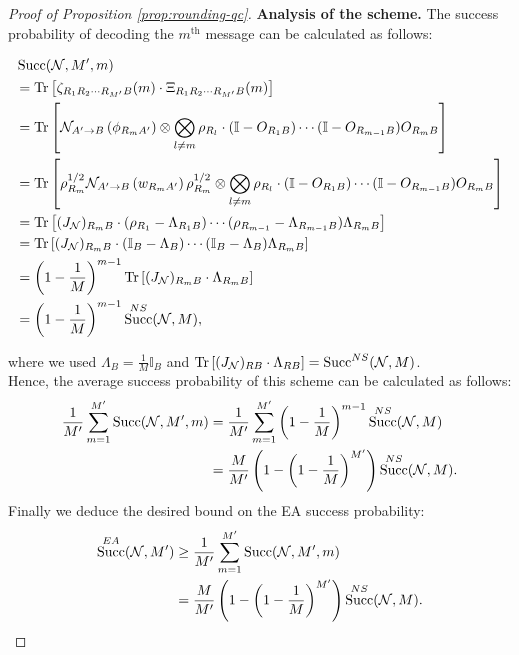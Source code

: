 \documentclass[a4paper,onecolumn,11pt,accepted=2025-10-01]{quantumarticle}
\DeclareMathOperator{\suc}{Succ}
\newcommand*{\dI}{\mathbb{I}}
\newcommand*{\cN}{\mathcal{N}}
\newcommand*{\tr}[1]{\mathrm{Tr}\left[#1\right]}
\begin{document}
\begin{proof}[Proof of Proposition \ref{prop:rounding-qc}]
   
\textbf{Analysis of the scheme.} 
The success probability of decoding the $m^{\text{th}}$ message can be calculated as follows:  
\begin{widetext}
    \begin{align}
        &\suc(\cN, M',m) \\&= \tr{\zeta_{R_1R_2\cdots R_{M'} B}(m) \cdot \Xi _{R_1R_2\cdots R_{M'} B}(m)  }
        \\&= \tr{\cN_{A'\rightarrow B}\left(\phi_{R_m A'}\right)\otimes \bigotimes_{l\neq m} \rho_{R_l}\cdot (\dI-O_{R_{1}B})\cdots(\dI-O_{R_{m-1}B})O_{R_mB}}
        \\&= \tr{ \rho_{R_m}^{1/2}\cN_{A'\rightarrow B}\left(w_{R_m A'}\right)\rho_{R_m}^{1/2}\otimes \bigotimes_{l\neq m} \rho_{R_l}\cdot (\dI-O_{R_{1}B})\cdots(\dI-O_{R_{m-1}B})O_{R_mB}}
           \\&= \tr{ (J_{\cN})_{R_m B}\cdot (\rho_{R_1}-\Lambda_{R_{1}B})\cdots(\rho_{R_{m-1}}-\Lambda_{R_{m-1}B})\Lambda_{R_mB}}
        \\&= \tr{ (J_{\cN})_{R_m B}\cdot (\dI_B-\Lambda_{B})\cdots(\dI_B-\Lambda_{B})\Lambda_{R_mB}}
        \\&= \left(1-\frac{1}{M}\right)^{m-1}\tr{ (J_{\cN})_{R_m B}\cdot \Lambda_{R_mB}}
        \\&= \left(1-\frac{1}{M}\right)^{m-1}\suc^{\rm{NS}}(\cN,M),\label{eq:sequential-exact}
    \end{align}
\end{widetext}
    where we used $\Lambda_B = \frac{1}{M}\dI_B$ and $ \tr{ (J_{\cN})_{R B}\cdot \Lambda_{RB}} = \suc^{\rm{NS}}(\cN,M)$. 
\\ Hence, the average success  probability of this scheme can be calculated as follows:
  \begin{align}
      \frac{1}{M'}\sum_{m=1}^{M'} \suc(\cN, M',m)
     &=   \frac{1}{M'}\sum_{m=1}^{M'} \left(1-\frac{1}{M}\right)^{m-1}\suc^{\rm{NS}}(\cN,M)
       \\&=\frac{M}{M'}\left(1-\left(1-\frac{1}{M}\right)^{M'}\right) \suc^{\rm{NS}}(\cN,M). 
    \end{align}
    Finally we deduce the desired bound on the EA success probability:
     \begin{align}
      \suc^{\rm{EA}}(\cN,M')
     &\ge \frac{1}{M'}\sum_{m=1}^{M'}\suc(\cN, M',m)
       \\&= \frac{M}{M'}\left(1-\left(1-\frac{1}{M}\right)^{M'}\right) \suc^{\rm{NS}}(\cN,M).
    \end{align}
\end{proof}
\end{document}

